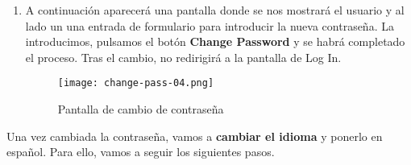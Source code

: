 \begin{enumerate}
    \item A continuación aparecerá una pantalla donde se nos mostrará el usuario y al lado un una entrada de formulario para introducir la nueva contraseña. La introducimos, pulsamos el botón \textbf{Change Password} y se habrá completado el proceso. Tras el cambio, no redirigirá a la pantalla de Log In.

    \begin{figure}[ht]
        \centering
        \texttt{[image: change-pass-04.png]}
        \caption{Pantalla de cambio de contraseña}
    \end{figure}
\end{enumerate}

Una vez cambiada la contraseña, vamos a \textbf{cambiar el idioma} y ponerlo en español. Para ello, vamos a seguir los siguientes pasos.

